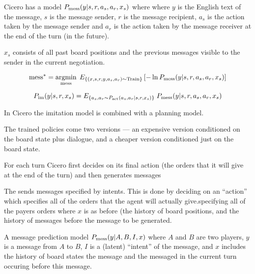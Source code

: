 {

Cicero has a model $P_{\mathrm{mess}}(y|s,r,a_s,a_r,x_s)$ where
where $y$ is the English text of the message, $s$ is the message sender, $r$ is the message recipient,
$a_s$ is the action taken by the message sender and $a_r$ is the action
taken by the message receiver at the end of the turn (in the future).

\vfill
$x_s$ consists of all past board positions and the previous messages visible to the sender in the current negotiation.


{\huge
$$\mathrm{mess}^* = \operatorname*{argmin}_{\mathrm{mess}}\;E_{\{(x,s,r,y,a_s,a_r) \sim \mathrm{Train}\}} \left[-\ln P_{\mathrm{mess}}(y|s,r,a_s,a_r,x_s)\right]$$
}


\vfill
$$P_{\mathrm{im}}(y|s,r,x_s) = E_{\{a_s,a_r \sim P_{\mathrm{act}}(a_s,a_r|s,r,x_s)\}}\;P_{\mathrm{mess}}(y|s,r,a_s,a_r,x_s)$$


\vfill
In Cicero the imitation model is combined with a planning model.




\vfill




\vfill
The trained policies come two versions --- an expensive version conditioned on the board state plus dialogue,
and a cheaper version conditioned just on the board state.

\vfill









For each turn Cicero first decides on its final action (the orders that it will give at the end of the turn) and then
generates messages 

\vfill
The sends messages specified by intents.  This is done by deciding on an ``action'' which specifies all of the orders
that the agent will actually give.specifying all of the payers orders
where $x$ is as before (the history of board positions, and the history of messages before the message to be generated.



\vfill
A message prediction model $P_{\mathrm{mess}}(y|A,B,I,x)$ where $A$ and $B$ are two players, $y$ is a message from $A$ to $B$, $I$ is a (latent) ``intent'' of the message, and
$x$ includes the history of board states the message and the messaged in the current turn occuring before this message.

}

